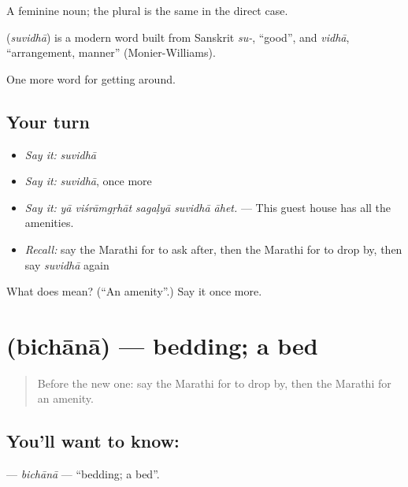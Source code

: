 A feminine noun; the plural is the same in the direct case.

\begin{cousinweb}
\textbf{} (\emph{suvidhā}) is a modern word built from Sanskrit \emph{su-}, \textquotedblleft{}good\textquotedblright{}, and \emph{vidhā}, \textquotedblleft{}arrangement, manner\textquotedblright{} (Monier-Williams).
\end{cousinweb}

\begin{grammarlens}[title={What you've built}]
One more word for getting around.
\end{grammarlens}

\subsection*{Your turn}
\begin{itemize}
\raggedright
  \item \emph{Say it:} \emph{suvidhā}
  \item \emph{Say it:} \emph{suvidhā}, once more
  \item \emph{Say it:} \emph{yā viśrāmgṛhāt sagaḷyā suvidhā āhet.} — This guest house has all the amenities.
  \item \emph{Recall:} say the Marathi for to ask after, then the Marathi for to drop by, then say \emph{suvidhā} again
\end{itemize}

\begin{tcolorbox}[breakable,colback=teal!4,colframe=teal!35!black,title={Before you move on}]
What does  mean? (\textquotedblleft{}An amenity\textquotedblright{}.) Say it once more.
\end{tcolorbox}
\section[\texorpdfstring{\mr{बिछाना} (bichānā)}{बिछाना (bichānā)}]{ (bichānā) — bedding; a bed}

\label{lesson:MR-C415-bichana}



\begin{quote}
Before the new one: say the Marathi for to drop by, then the Marathi for an amenity.
\end{quote}

\subsection*{You'll want to know: }
\textbf{} — \emph{bichānā} — \textquotedblleft{}bedding; a bed\textquotedblright{}.

